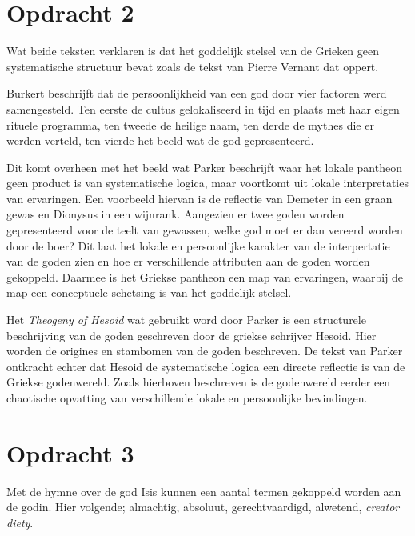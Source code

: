 \documentclass[10pt]{amsart}
\begin{document}
\section*{Opdracht 2}\label{opdracht2}
Wat beide teksten\autocite{parkerPolytheismSocietyAthens2005}\autocite{burkertGreekReligionArchaic1985} verklaren is dat het goddelijk stelsel van de Grieken geen systematische structuur bevat zoals de tekst van Pierre Vernant \autocite{vernantGreceAncienneEtude1976} dat oppert. 

Burkert beschrijft dat de persoonlijkheid van een god door vier factoren werd samengesteld. Ten eerste de cultus gelokaliseerd in tijd en plaats met haar eigen rituele programma, ten tweede de heilige naam, ten derde de mythes die er werden verteld, ten vierde het beeld wat de god gepresenteerd.\autocite{burkertGreekReligionArchaic1985}

Dit komt overheen met het beeld wat Parker beschrijft waar het lokale pantheon geen product is van systematische logica, maar voortkomt uit lokale interpretaties van ervaringen. Een voorbeeld hiervan is de reflectie van Demeter in een graan gewas en Dionysus in een wijnrank. Aangezien er twee goden worden gepresenteerd voor de teelt van gewassen, welke god moet er dan vereerd worden door de boer? Dit laat het lokale en persoonlijke karakter van de interpertatie van de goden zien en hoe er verschillende attributen aan de goden worden gekoppeld. Daarmee is het Griekse pantheon een map van ervaringen, waarbij de map een conceptuele schetsing is van het goddelijk stelsel.\autocite{parkerPolytheismSocietyAthens2005}

Het \textit{Theogeny of Hesoid} wat gebruikt word door Parker\autocite{parkerPolytheismSocietyAthens2005} is een structurele beschrijving van de goden geschreven door de griekse schrijver Hesoid\autocite{atsmaHESIODTHEOGONY2017}. Hier worden de origines en stambomen van de goden beschreven. De tekst van Parker ontkracht echter dat Hesoid de systematische logica een directe reflectie is van de Griekse godenwereld. Zoals hierboven beschreven is de godenwereld eerder een chaotische opvatting van verschillende lokale en persoonlijke bevindingen.

\section*{Opdracht 3}
Met de hymne over de god Isis\autocite{i.AretologieVanIsis} kunnen een aantal termen gekoppeld worden aan de godin. Hier volgende; almachtig, absoluut, gerechtvaardigd, alwetend, \textit{creator diety}.
\end{document}

